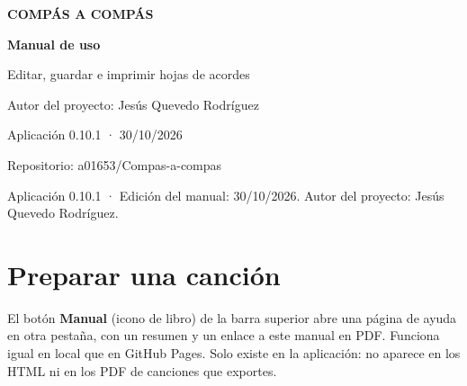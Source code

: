 \documentclass[a4paper,11pt]{article}
\begin{document}
\begin{titlepage}
\thispagestyle{empty}
\pagecolor{navybg}
\color{white}
\vspace*{3cm}
\begin{center}
{\sffamily\bfseries\fontsize{16}{19}\selectfont\color{amber} COMPÁS A COMPÁS\par}
\vspace{1cm}
\par
\vspace{1.4cm}
{\sffamily\bfseries\fontsize{30}{38}\selectfont Manual de uso\par}
\vspace{0.8cm}
{\sffamily\fontsize{14}{20}\selectfont\color{lightblue} Editar, guardar e imprimir hojas de acordes\par}
\vfill
{\sffamily\small Autor del proyecto: Jesús Quevedo Rodríguez\par}
{\sffamily\small Aplicación 0.10.1 · 30/10/2026\par}
{\sffamily\small Repositorio: a01653/Compas-a-compas\par}
\vspace{2cm}
\end{center}
\end{titlepage}
\nopagecolor
\restoregeometry
\setcounter{page}{2}
\tableofcontents
\newpage
Aplicación 0.10.1 · Edición del manual: 30/10/2026. Autor del proyecto:
Jesús Quevedo Rodríguez.

\Needspace{3.5cm}
\section{Preparar una canción}\label{preparar-una-canciuxf3n}

El botón \textbf{Manual} (icono de libro) de la barra superior abre una
página de ayuda en otra pestaña, con un resumen y un enlace a este
manual en PDF. Funciona igual en local que en GitHub Pages. Solo existe
en la aplicación: no aparece en los HTML ni en los PDF de canciones que
exportes.
\end{document}
